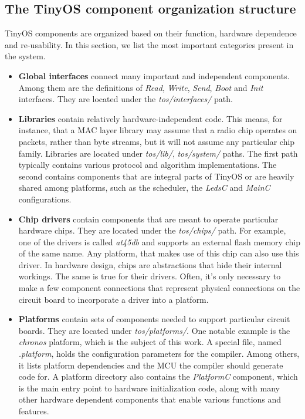 \subsection{The TinyOS component organization structure}

TinyOS components are organized based on their function, hardware
dependence and re-usability. In this section, we list the most
important categories present in the system.

\begin{itemize}
  \item {\bf Global interfaces} connect many important and independent components. Among them are the definitions of \emph{Read}, \emph{Write}, \emph{Send}, \emph{Boot} and \emph{Init} interfaces. They are located under the \emph{tos/interfaces/} path.

  \item {\bf Libraries} contain relatively hardware-independent code.  This means, for instance, that a MAC layer library may assume that a radio chip operates on packets, rather than byte streams, but it will not assume any particular chip family. Libraries are located under \emph{tos/lib/}, \emph{tos/system/} paths. The first path typically contains various protocol and algorithm implementations. The second contains components that are integral parts of TinyOS or are heavily shared among platforms, such as the scheduler, the \emph{LedsC} and \emph{MainC} configurations.

  \item {\bf Chip drivers} contain components that are meant to operate particular hardware chips. They are located under the \emph{tos/chips/} path. For example, one of the drivers is called \emph{at45db} and supports an external flash memory chip of the same name. Any platform, that makes use of this chip can also use this driver. In hardware design, chips are abstractions that hide their internal workings. The same is true for their drivers. Often, it's only necessary to make a few component connections that represent physical connections on the circuit board to incorporate a driver into a platform.

  \item {\bf Platforms} contain sets of components needed to support particular circuit boards. They are located under \emph{tos/platforms/}. One notable example is the \emph{chronos} platform, which is the subject of this work. A special file, named \emph{.platform}, holds the configuration parameters for the compiler. Among others, it lists platform dependencies and the MCU the compiler should generate code for. A platform directory  also contains the \emph{PlatformC} component, which is the main entry point to hardware initialization code, along with many other hardware dependent components that enable various functions and features.


\end{itemize}
